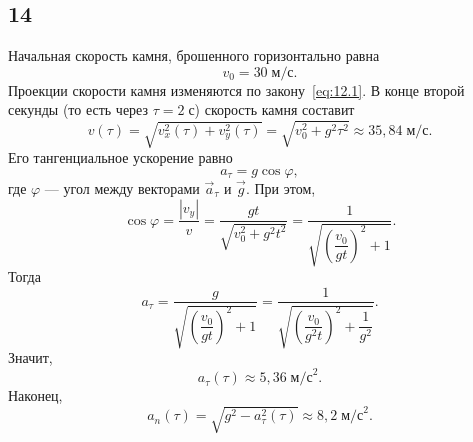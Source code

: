 \subsection{14}

Начальная скорость камня, брошенного горизонтально равна
\[
v_0=30\;\text{м/с}.
\]
Проекции скорости камня изменяются по закону~\eqref{eq:12.1}. В конце второй секунды (то есть через $\tau=2\;\text{с}$) скорость камня составит
\[
v(\tau)=\sqrt{v_x^2(\tau)+v_y^2(\tau)}=\sqrt{v_0^2+g^2\tau^2}\approx35{,}84\;\text{м/с}.
\]
Его тангенциальное ускорение равно
\[
a_\tau=g\cos\varphi,
\]
где $\varphi$ --- угол между векторами $\vec a_\tau$ и $\vec g$. При этом,
\[
\cos\varphi=\frac{|v_y|}{v}=\frac{gt}{\sqrt{v_0^2+g^2t^2}}=\frac{1}{\sqrt{\left(\dfrac{v_0}{gt}\right)^2+1}}.
\]
Тогда
\[
a_\tau=\frac{g}{\sqrt{\left(\dfrac{v_0}{gt}\right)^2+1}}=\frac{1}{\sqrt{\left(\dfrac{v_0}{g^2t}\right)^2+\dfrac{1}{g^2}}}.
\]
Значит,
\[
a_\tau(\tau)\approx5{,}36\;\text{м/с}^2.
\]
Наконец,
\[
a_n(\tau)=\sqrt{g^2-a_\tau^2(\tau)}\approx8{,}2\;\text{м/с}^2.
\]